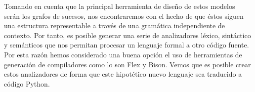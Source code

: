 Tomando en cuenta que la principal herramienta de diseño de estos modelos serán
los grafos de sucesos, nos encontraremos con el hecho de que éstos siguen una
estructura representable a través de una gramática independiente de contexto.
Por tanto, es posible generar una serie de analizadores léxico, sintáctico y
semánticos que nos permitan procesar un lenguaje formal a otro código fuente.
Por esta razón hemos considerado una buena opción el uso de herramientas de
generación de compiladores como lo son Flex y Bison. Vemos que es posible crear
estos analizadores de forma que este hipotético nuevo lenguaje sea traducido a
código Python.



